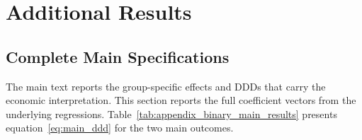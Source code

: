 \documentclass[11 pt]{article}
\begin{document}
\clearpage


\section{Additional Results}
\label{app:additional_results}

\subsection{Complete Main Specifications}
\label{app:complete_main_results}

The main text reports the group-specific effects and DDDs that carry the economic interpretation. This section reports the full coefficient vectors from the underlying regressions. Table~\ref{tab:appendix_binary_main_results} presents equation~\eqref{eq:main_ddd} for the two main outcomes.
\end{document}
